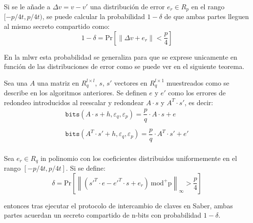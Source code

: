 Si se le añade a $\Delta v = v-v'$ una distribución de error \(e_r \in R_p\) en el rango \([-p/4t,p/4t)\), se puede calcular la probabilidad \(1-\delta\) de que ambas partes lleguen al mismo secreto compartido como:
\begin{equation}
	\label{eq:Frodo}
	1-\delta= \text{Pr}\left[\|\Delta v + e_r\|< \dfrac{p}{4}\right]
\end{equation}

En la \gls{mlwr} esta probabilidad se generaliza para que se exprese unicamente en función de las distribuciones de error como se puede ver en el siguiente teorema.

\begin{theorem}
 Sea una \(A\) una matriz en \(R_q^{l\times l}\), \(s\), \(s'\) vectores en \(R_q^{l\times 1}\) muestreados como se describe en los algoritmos anteriores. Se definen \(e\) y \(e'\) como los errores de redondeo introducidos al reescalar y redondear \(A\cdot s\) y \(A^T\cdot s'\), es decir:
 \begin{equation}
 	\label{eq:bitsec}
 	\begin{array}{l}
 		\texttt{bits}(A\cdot s+h,\varepsilon_q,\varepsilon_p)=\dfrac{p}{q}\cdot A\cdot
 		s +e\\\\
 		\texttt{bits}(A^T\cdot s'+h,\varepsilon_q,\varepsilon_p)=\dfrac{p}{q}\cdot A^T\cdot
 		s' +e'\\
 	\end{array}
 \end{equation}
 
 Sea \(e_r  \in R_q\) in polinomio con los coeficientes distribuidos uniformemente en el rango \([-p/4t,p/4t]\). Si se define:
 \begin{equation}
 	\label{eq:probrefeSab}
 	\delta = \text{Pr}\left[\left\|\left(s'^T\cdot e-e'^T\cdot s+ e_r\right) \ \text{mod}^{+}\text{p}  \right\|_\infty > \dfrac{p}{4}\right]
 \end{equation}
 
 entonces tras ejecutar el protocolo de intercambio de claves en Saber, ambas partes acuerdan un secreto compartido de n-bits con probabilidad \(1-\delta\).
\end{theorem} 
